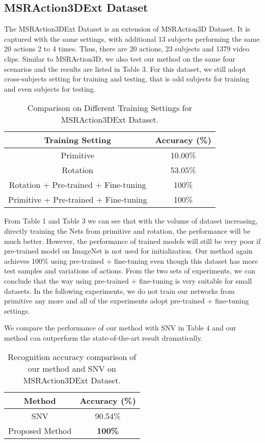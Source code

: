 \documentclass[conference]{IEEEtran}
\begin{document}
\subsection{MSRAction3DExt Dataset}
The MSRAction3DExt Dataset is an extension of MSRAction3D Dataset. It is captured with the same settings, with additional 13 subjects performing the same 20 actions 2 to 4 times. Thus, there are 20 actions, 23 subjects and 1379 video clips.
Similar to MSRAction3D, we also test our method on the same four scenarios and the results are listed in Table 3. For this dataset, we still adopt cross-subjects setting for training and testing, that is odd subjects for training and even subjects for testing.

\begin{table}[h]
\centering
\caption{Comparison on Different Training Settings for MSRAction3DExt Dataset.}
\begin{tabular}{|c|c|}
\hline
Training Setting & Accuracy (\%)\\
\hline
Primitive & 10.00\%  \\
\hline
Rotation & 53.05\%\\
\hline
Rotation + Pre-trained + Fine-tuning & 100\%  \\
\hline
Primitive + Pre-trained + Fine-tuning & 100\%  \\
\hline
\end{tabular}
\end{table}
From Table 1 and Table 3 we can see that with the volume of dataset increasing, directly training the Nets from primitive and rotation, the performance will be much better. However, the performance of trained models will still be very poor if pre-trained model on ImageNet is not used for initialization. Our method again achieves 100\% using pre-trained + fine-tuning even though this dataset has more test samples and variations of actions.
From the two sets of experiments, we can conclude that the way using pre-trained + fine-tuning is very suitable for small datasets.
In the following experiments, we do not train our networks from primitive any more and all of the experiments adopt pre-trained + fine-tuning settings.

We compare the performance of our method with SNV \cite{yangsuper} in Table 4 and our method can outperform the state-of-the-art result dramatically.

\begin{table}[h]
\centering
\caption{Recognition accuracy comparison of our method and SNV on MSRAction3DExt Dataset.}
\begin{tabular}{|c|c|}
\hline
Method & Accuracy (\%)\\
\hline
SNV \cite{yangsuper} & 90.54\%  \\
\hline
Proposed Method & \textbf{100\%}  \\
\hline
\end{tabular}
\end{table}
\end{document}
